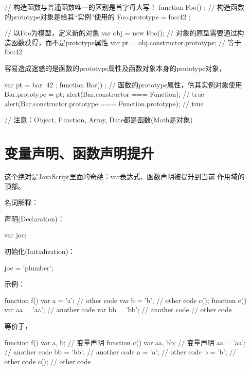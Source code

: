 \documentclass[a4paper,11pt]{article}
\begin{document}
\begin{javascriptcode}
  // 构造函数与普通函数唯一的区别是首字母大写！
  function Foo() {};
  // 构造函数的prototype对象是给其“实例”使用的
  Foo.prototype = {
    foo:42
  };

  // 以Foo为模型，定义新的对象
  var obj = new Foo();
  // 对象的原型需要通过构造函数获得，而不是prototype属性
  var pt = obj.constructor.prototype; // 等于 {foo:42}
\end{javascriptcode}

容易造成迷惑的是函数的prototype属性及函数对象本身的prototype对象，

\begin{javascriptcode}
var pt = {
    bar: 42
};
function Bar() {};
// 函数的prototype属性，供其实例对象使用
Bar.prototype = pt;
alert(Bar.constructor === Function); // true
alert(Bar.constructor.prototype === Function.prototype); // true

// 注意：Object, Function, Array, Date都是函数(Math是对象)
\end{javascriptcode}

\section[变量声明、函数声明提升]{变量声明、函数声明提升}
这个绝对是JavaScript里面的奇葩：var表达式、函数声明被提升到当前
作用域的顶部。

名词解释：

声明(Declaration)：\\
\begin{javascriptcode}
  var joe;
\end{javascriptcode}

初始化(Initialization)：\\
\begin{javascriptcode}
  joe = 'plumber';
\end{javascriptcode}

示例：\\
\begin{javascriptcode}
  function f() {
    var a = 'a';
    // other code
    var b = 'b';
    // other code
    c();
    function c() {
      var aa = 'aa';
      // another code
      var bb = 'bb';
      // another code
    }
    // other code
  }
\end{javascriptcode}

等价于，

\begin{javascriptcode}
  function f() {
    var a, b; // 变量声明
    function c() {
      var aa, bb; // 变量声明
      aa = 'aa';
      // another code
      bb = 'bb';
      // another code
    }
    a = 'a';
    // other code
    b = 'b';
    // other code
    c();
    // other code
  }
\end{javascriptcode}
\end{document}
